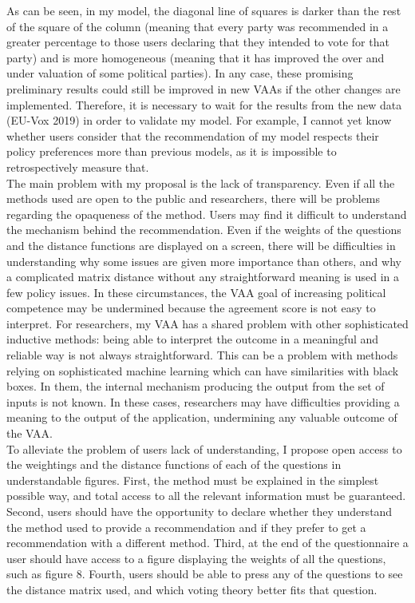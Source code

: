 \documentclass{scrartcl}
\begin{document}
As can be seen, in my model, the diagonal line of squares is darker than the rest of the square of the column (meaning that every party was recommended in a greater percentage to those users declaring that they intended to vote for that party) and is more homogeneous (meaning that it has improved the over and under valuation of some political parties). In any case, these promising preliminary results could still be improved in new VAAs if the other changes are implemented. Therefore, it is necessary to wait for the results from the new data (EU-Vox 2019) in order to validate my model. For example, I cannot yet know whether users consider that the recommendation of my model respects their policy preferences more than previous models, as it is impossible to retrospectively measure that. 
\\

The main problem with my proposal is the lack of transparency. Even if all the methods used are open to the public and researchers, there will be problems regarding the opaqueness of the method. Users may find it difficult to understand the mechanism behind the recommendation. Even if the weights of the questions and the distance functions are displayed on a screen, there will be difficulties in understanding why some issues are given more importance than others, and why a complicated matrix distance without any straightforward meaning is used in a few policy issues. In these circumstances, the VAA goal of increasing political competence may be undermined because the agreement score is not easy to interpret. For researchers, my VAA has a shared problem with other sophisticated inductive methods: being able to interpret the outcome in a meaningful and reliable way is not always straightforward. This can be a problem with methods relying on sophisticated machine learning which can have similarities with black boxes. In them, the internal mechanism producing the output from the set of inputs is not known. In these cases, researchers may have difficulties providing a meaning to the output of the application, undermining any valuable outcome of the VAA.  
\\

To alleviate the problem of users lack of understanding, I propose open access to the weightings and the distance functions of each of the questions in understandable figures. First, the method must be explained in the simplest possible way, and total access to all the relevant information must be guaranteed. Second, users should have the opportunity to declare whether they  understand the method used to provide a recommendation and if they prefer to get a recommendation with a different method. Third, at the end of the questionnaire a user should have access to a figure displaying the weights of all the questions, such as figure 8. Fourth, users should be able to press any of the questions to see the distance matrix used, and which voting theory better fits that question. 
\end{document}
